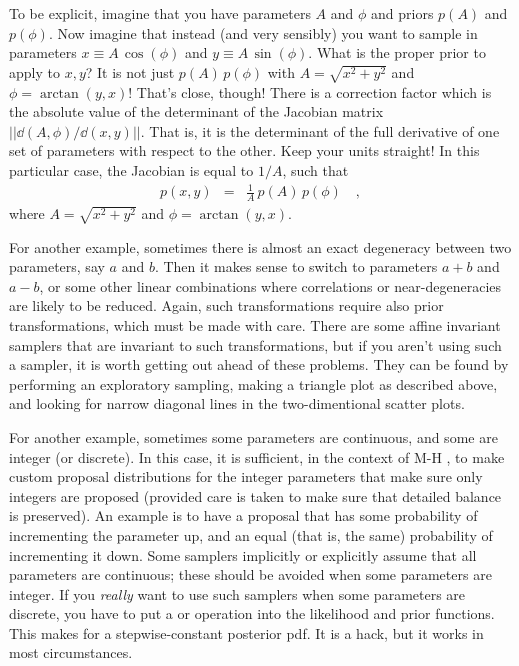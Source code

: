 \documentclass[modern]{aastex61}
\newcommand{\MCMC}{\acronym{MCMC}}
\begin{document}
To be explicit, imagine that you have parameters $A$ and $\phi$ and
priors $p(A)$ and $p(\phi)$.
Now imagine that instead (and very sensibly) you want to sample in
parameters $x\equiv A\,\cos(\phi)$ and $y\equiv A\,\sin(\phi)$.
What is the proper prior to apply to $x, y$?
It is not just $p(A)\,p(\phi)$ with $A=\sqrt{x^2 + y^2}$ and $\phi=\arctan(y,x)$!
That's close, though! There is a correction factor which is the
absolute value of the determinant of the Jacobian matrix
$||{\dd(A,\phi)}/{\dd(x,y)}||$.
That is, it is the determinant of the full derivative of one set of
parameters with respect to the other.
Keep your units straight!
In this particular case, the Jacobian is equal to $1/A$, such that
\begin{eqnarray}
  p(x,y) &=& \frac{1}{A}\,p(A)\,p(\phi)
  \quad ,
\end{eqnarray}
where $A=\sqrt{x^2 + y^2}$ and $\phi=\arctan(y,x)$.

For another example, sometimes there is almost an exact degeneracy between two parameters,
  say $a$ and $b$.  Then it makes sense to switch to parameters $a+b$ and $a-b$,
  or some other linear combinations where correlations or near-degeneracies are likely to be reduced.
Again, such transformations require also prior transformations, which must be made with care.
There are some affine invariant samplers that are invariant to such
transformations, but if you aren't using such a sampler, it is worth
getting out ahead of these problems.
They can be found by performing an exploratory sampling,
  making a triangle plot as described above,
  and looking for narrow diagonal lines in the two-dimentional scatter plots.

For another example, sometimes some parameters are continuous, and some
are integer (or discrete).
In this case, it is sufficient, in the context of M-H \MCMC, to make
custom proposal distributions for the integer parameters that make sure
only integers are proposed (provided care is taken to make sure that detailed
balance is preserved).
An example is to have a proposal that has some probability of
incrementing the parameter up, and an equal (that is, the same) probability
of incrementing it down.
Some samplers implicitly or explicitly assume that all parameters are
continuous; these should be avoided
when some parameters are integer.
If you \emph{really} want to use such samplers when some parameters
are discrete, you have to put a  or 
operation into the likelihood and prior functions.
This makes for a stepwise-constant posterior pdf. It is a hack, but it
works in most circumstances.
\end{document}
